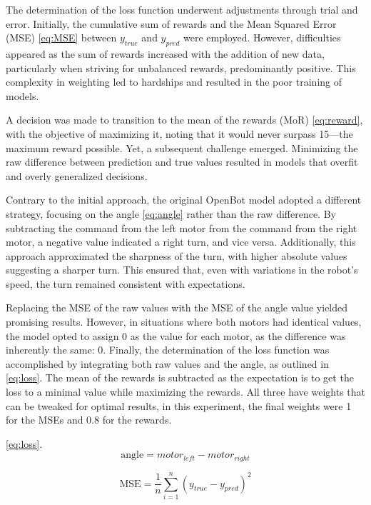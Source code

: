 \documentclass[12pt]{report}
\begin{document}
The determination of the loss function underwent adjustments through trial and error. Initially, the cumulative sum of rewards and the Mean Squared Error (MSE) \ref{eq:MSE} between $y_{true}$ and $y_{pred}$ were employed. However, difficulties appeared as the sum of rewards increased with the addition of new data, particularly when striving for unbalanced rewards, predominantly positive. This complexity in weighting led to hardships and resulted in the poor training of models.

A decision was made to transition to the mean of the rewards (MoR) \ref{eq:reward}, with the objective of maximizing it, noting that it would never surpass 15—the maximum reward possible. Yet, a subsequent challenge emerged. Minimizing the raw difference between prediction and true values resulted in models that overfit and overly generalized decisions.

Contrary to the initial approach, the original OpenBot model adopted a different strategy, focusing on the angle \ref{eq:angle} rather than the raw difference. By subtracting the command from the left motor from the command from the right motor, a negative value indicated a right turn, and vice versa. Additionally, this approach approximated the sharpness of the turn, with higher absolute values suggesting a sharper turn. This ensured that, even with variations in the robot's speed, the turn remained consistent with expectations.

Replacing the MSE of the raw values with the MSE of the angle value yielded promising results. However, in situations where both motors had identical values, the model opted to assign 0 as the value for each motor, as the difference was inherently the same: 0. Finally, the determination of the loss function was accomplished by integrating both raw values and the angle, as outlined in \ref{eq:loss}. The mean of the rewards is subtracted as the expectation is to get the loss to a minimal value while maximizing the rewards. All three have weights that can be tweaked for optimal results, in this experiment, the final weights were 1 for the MSEs and 0.8 for the rewards.

\ref{eq:loss}. 
\begin{equation}
\label{eq:angle}
\text{angle} = motor_{left} - motor_{right}
\end{equation}

\begin{equation}
\label{eq:MSE}
\text{MSE} = \frac{1}{n} \sum_{i=1}^{n} (y_{true} - y_{pred})^2
\end{equation}
\end{document}
